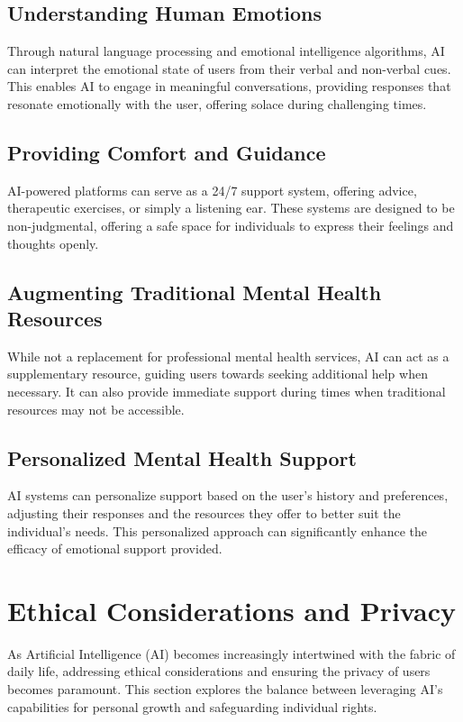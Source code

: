 \documentclass[12pt]{article}
\begin{document}
\subsection*{Understanding Human Emotions}
Through natural language processing and emotional intelligence algorithms, AI can interpret the emotional state of users from their verbal and non-verbal cues. This enables AI to engage in meaningful conversations, providing responses that resonate emotionally with the user, offering solace during challenging times.

\subsection*{Providing Comfort and Guidance}
AI-powered platforms can serve as a 24/7 support system, offering advice, therapeutic exercises, or simply a listening ear. These systems are designed to be non-judgmental, offering a safe space for individuals to express their feelings and thoughts openly.

\subsection*{Augmenting Traditional Mental Health Resources}
While not a replacement for professional mental health services, AI can act as a supplementary resource, guiding users towards seeking additional help when necessary. It can also provide immediate support during times when traditional resources may not be accessible.

\subsection*{Personalized Mental Health Support}
AI systems can personalize support based on the user's history and preferences, adjusting their responses and the resources they offer to better suit the individual's needs. This personalized approach can significantly enhance the efficacy of emotional support provided.

\section{Ethical Considerations and Privacy}
As Artificial Intelligence (AI) becomes increasingly intertwined with the fabric of daily life, addressing ethical considerations and ensuring the privacy of users becomes paramount. This section explores the balance between leveraging AI's capabilities for personal growth and safeguarding individual rights.
\end{document}
